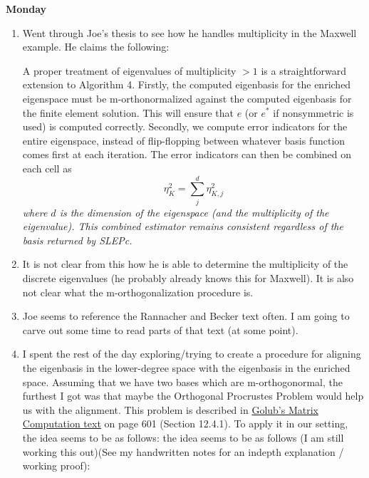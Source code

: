 \documentclass[12pt,a4paper]{article}
\begin{document}
\textbf{Monday}

\begin{enumerate}
    \item Went through Joe's thesis to see how he handles multiplicity in the Maxwell example. He claims the following:
    \begin{itshape}A proper treatment of eigenvalues of multiplicity $> 1$ is a straightforward extension to Algorithm 4. Firstly, the computed eigenbasis for the enriched eigenspace must be m-orthonormalized against the computed eigenbasis for the finite element solution. This will ensure that $e$ (or $e^*$ if nonsymmetric is used) is computed correctly. Secondly, we compute error indicators for the entire eigenspace, instead of flip-flopping between whatever basis function comes first at each iteration. The error indicators can then be combined on each cell as
    $$ \eta_K^2 = \sum_j^d \eta_{K, j}^2$$
    \textit{where $d$ is the dimension of the eigenspace (and the multiplicity of the eigenvalue). This combined estimator remains consistent regardless of the basis returned by SLEPc.}\end{itshape}
    \item It is not clear from this how he is able to determine the multiplicity of the discrete eigenvalues (he probably already knows this for Maxwell). It is also not clear what the m-orthogonalization procedure is. 
    \item Joe seems to reference the Rannacher and Becker text often. I am going to carve out some time to read parts of that text (at some point).
    \item I spent the rest of the day exploring/trying to create a procedure for aligning the eigenbasis in the lower-degree space with the eigenbasis in the enriched space. Assuming that we have two bases which are m-orthogonormal, the furthest I got was that maybe the Orthogonal Procrustes Problem would help us with the alignment. This problem is described in \href{https://pages.stat.wisc.edu/~bwu62/771/golub1996.pdf}{Golub's Matrix Computation text} on page 601 (Section 12.4.1). To apply it in our setting, the idea seems to be as follows:
    the idea seems to be as follows (I am still working this out)(See my handwritten notes for an indepth explanation / working proof):


\end{enumerate}
\end{document}
